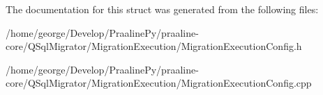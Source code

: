 The documentation for this struct was generated from the following files\+:\begin{DoxyCompactItemize}
\item 
/home/george/\+Develop/\+Praaline\+Py/praaline-\/core/\+Q\+Sql\+Migrator/\+Migration\+Execution/Migration\+Execution\+Config.\+h\item 
/home/george/\+Develop/\+Praaline\+Py/praaline-\/core/\+Q\+Sql\+Migrator/\+Migration\+Execution/Migration\+Execution\+Config.\+cpp\end{DoxyCompactItemize}
